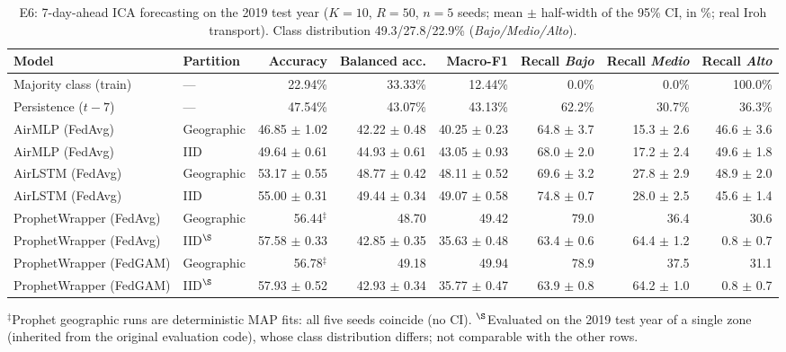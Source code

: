 \begin{table}[t]
\centering
\caption{E6: 7-day-ahead ICA forecasting on the 2019 test year ($K{=}10$, $R{=}50$, $n{=}5$ seeds; mean $\pm$ half-width of the 95\% CI, in \%; real Iroh transport). Class distribution 49.3/27.8/22.9\% (\textit{Bajo/Medio/Alto}).}
\label{tab:e6}
\scriptsize
\setlength{\tabcolsep}{4pt}
\begin{tabular}{l l r r r r r r}
\toprule
\textbf{Model} & \textbf{Partition} & \textbf{Accuracy} & \textbf{Balanced acc.} & \textbf{Macro-F1} & \textbf{Recall \textit{Bajo}} & \textbf{Recall \textit{Medio}} & \textbf{Recall \textit{Alto}} \\
\midrule
Majority class (train)          & ---        & 22.94\% & 33.33\% & 12.44\% & 0.0\% & 0.0\% & 100.0\% \\
Persistence ($t{-}7$)           & ---        & 47.54\% & 43.07\% & 43.13\% & 62.2\% & 30.7\% & 36.3\% \\
\midrule
AirMLP (FedAvg)                 & Geographic & 46.85 $\pm$ 1.02 & 42.22 $\pm$ 0.48 & 40.25 $\pm$ 0.23 & 64.8 $\pm$ 3.7 & 15.3 $\pm$ 2.6 & 46.6 $\pm$ 3.6 \\
AirMLP (FedAvg)                 & IID        & 49.64 $\pm$ 0.61 & 44.93 $\pm$ 0.61 & 43.05 $\pm$ 0.93 & 68.0 $\pm$ 2.0 & 17.2 $\pm$ 2.4 & 49.6 $\pm$ 1.8 \\
AirLSTM (FedAvg)                & Geographic & 53.17 $\pm$ 0.55 & 48.77 $\pm$ 0.42 & 48.11 $\pm$ 0.52 & 69.6 $\pm$ 3.2 & 27.8 $\pm$ 2.9 & 48.9 $\pm$ 2.0 \\
AirLSTM (FedAvg)                & IID        & 55.00 $\pm$ 0.31 & 49.44 $\pm$ 0.34 & 49.07 $\pm$ 0.58 & 74.8 $\pm$ 0.7 & 28.0 $\pm$ 2.5 & 45.6 $\pm$ 1.4 \\
\midrule
ProphetWrapper (FedAvg)         & Geographic & 56.44$^{\ddagger}$ & 48.70 & 49.42 & 79.0 & 36.4 & 30.6 \\
ProphetWrapper (FedAvg)         & IID$^{\S}$ & 57.58 $\pm$ 0.33 & 42.85 $\pm$ 0.35 & 35.63 $\pm$ 0.48 & 63.4 $\pm$ 0.6 & 64.4 $\pm$ 1.2 & 0.8 $\pm$ 0.7 \\
ProphetWrapper (FedGAM)         & Geographic & 56.78$^{\ddagger}$ & 49.18 & 49.94 & 78.9 & 37.5 & 31.1 \\
ProphetWrapper (FedGAM)         & IID$^{\S}$ & 57.93 $\pm$ 0.52 & 42.93 $\pm$ 0.34 & 35.77 $\pm$ 0.47 & 63.9 $\pm$ 0.8 & 64.2 $\pm$ 1.0 & 0.8 $\pm$ 0.7 \\
\bottomrule
\end{tabular}
\vspace{0.3em}

{\scriptsize $^{\ddagger}$Prophet geographic runs are deterministic MAP fits: all five seeds coincide (no CI). $^{\S}$Evaluated on the 2019 test year of a single zone (inherited from the original evaluation code), whose class distribution differs; not comparable with the other rows.}
\end{table}

